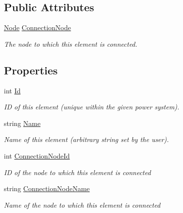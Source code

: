 \subsection*{Public Attributes}
\begin{DoxyCompactItemize}
\item 
\hyperlink{class_power_system_planning_1_1_node}{Node} \hyperlink{class_power_system_planning_1_1_node_element_ade5e2883dbd6d8676a8572c827f6b60a}{Connection\+Node}
\begin{DoxyCompactList}\small\item\em The node to which this element is connected. \end{DoxyCompactList}\end{DoxyCompactItemize}
\subsection*{Properties}
\begin{DoxyCompactItemize}
\item 
int \hyperlink{class_power_system_planning_1_1_node_element_aa18ee6e98501ec6c8c235058888a47e3}{Id}
\begin{DoxyCompactList}\small\item\em ID of this element (unique within the given power system). \end{DoxyCompactList}\item 
string \hyperlink{class_power_system_planning_1_1_node_element_a07a0b254e0ac3b4b97dd45bde0a44291}{Name}
\begin{DoxyCompactList}\small\item\em Name of this element (arbitrary string set by the user). \end{DoxyCompactList}\item 
int \hyperlink{class_power_system_planning_1_1_node_element_ad8330c198a514aa94bc329e89125796a}{Connection\+Node\+Id}
\begin{DoxyCompactList}\small\item\em ID of the node to which this element is connected \end{DoxyCompactList}\item 
string \hyperlink{class_power_system_planning_1_1_node_element_a0649bf960bef5b6e95ab990de84caa66}{Connection\+Node\+Name}
\begin{DoxyCompactList}\small\item\em Name of the node to which this element is connected \end{DoxyCompactList}\end{DoxyCompactItemize}


